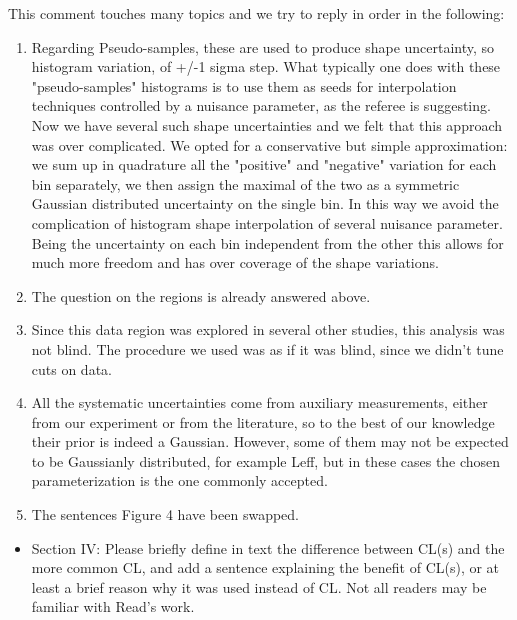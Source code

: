 \documentclass{article}
\begin{document}
This comment touches many topics and we try to reply in order in the following:
\begin{enumerate}
	\item Regarding Pseudo-samples, these are used to produce shape uncertainty, so histogram variation, of +/-1 sigma step. What typically one does with these "pseudo-samples" histograms  is to use them as seeds for interpolation techniques controlled by a nuisance parameter, as the referee is suggesting. Now we have several such shape uncertainties and we felt that this approach was over complicated. We opted for a conservative but simple approximation: we sum up in quadrature all the "positive" and "negative" variation for each bin separately, we then assign the maximal of the two as a symmetric Gaussian distributed uncertainty on the single bin.  In this way we avoid the complication of histogram shape interpolation of several nuisance parameter. Being the uncertainty on each bin independent from the other this allows for much more freedom and has over coverage of the shape variations.
	
	\item The question on the regions is already answered above. 
	
	\item Since this data region was explored in several other studies, this analysis was not blind.
		The procedure we used was as if it was blind, since we didn't tune cuts on data.

	\item All the systematic uncertainties come from auxiliary measurements, either from our experiment or from the literature, so 
		to the best of our knowledge their prior is indeed a Gaussian. 
		However, some of them may not be expected to be Gaussianly distributed, for example Leff, but in these cases the chosen parameterization
		is the one commonly accepted.

	\item The sentences Figure 4 have been swapped.
\end{enumerate}





\begin{itemize}
	\item {\color{blue} Section IV: Please briefly define in text the difference between CL(s)
and the more common CL, and add a sentence explaining the benefit of
CL(s), or at least a brief reason why it was used instead of CL. Not
all readers may be familiar with Read’s work.}
\end{itemize}
\end{document}
